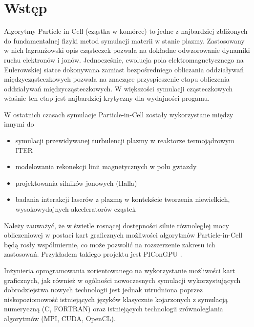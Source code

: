 \section[Wstęp]{Wstęp} %
Algorytmy Particle-in-Cell (cząstka w komórce) to jedne z najbardziej zbliżonych do fundamentalnej fizyki
metod symulacji materii w stanie plazmy. Zastosowany w nich lagranżowski opis cząsteczek pozwala na dokładne
odwzorowanie dynamiki ruchu elektronów i jonów. Jednocześnie, ewolucja pola elektromagnetycznego na Eulerowskiej
siatce dokonywana zamiast bezpośredniego obliczania oddziaływań międzycząsteczkowych pozwala na znaczące
przyspieszenie etapu obliczenia oddziaływań międzycząsteczkowych. W większości symulacji cząsteczkowych właśnie
ten etap jest najbardziej krytyczny dla wydajności progamu.

W ostatnich czasach symulacje Particle-in-Cell zostały wykorzystane między innymi do
\begin{itemize}
\item symulacji przewidywanej turbulencji plazmy w reaktorze termojądrowym ITER \cite{pic-hammett}
\item modelowania rekonekcji linii magnetycznych w polu gwiazdy \cite{pic-reconnection}
\item projektowania silników jonowych (Halla) \cite{pic-hallengine}
\item badania interakcji laserów z plazmą w kontekście tworzenia niewielkich,
    wysokowydajnych akceleratorów cząstek \cite{pic-laserplasma}
\end{itemize}

    Należy zauważyć, że w świetle rosnącej dostępności silnie równoległej mocy obliczeniowej w postaci kart graficznych
    możliwości algorytmów Particle-in-Cell będą rosły współmiernie, co może pozwolić na rozszerzenie zakresu ich zastosowań.
    Przykładem takiego projektu jest PIConGPU \cite{picongpu}.

    Inżynieria oprogramowania zorientowanego na wykorzystanie możliwości kart graficznych,
    jak również w ogólności nowoczesnych symulacji wykorzystujących dobrodziejstwa nowych technologii
    jest jednak utrudniona poprzez niskopoziomowość istniejących języków klasycznie
    kojarzonych z symulacją numeryczną (C, FORTRAN) oraz istniejących technologii zrównoleglania
    algorytmów (MPI, CUDA, OpenCL).

